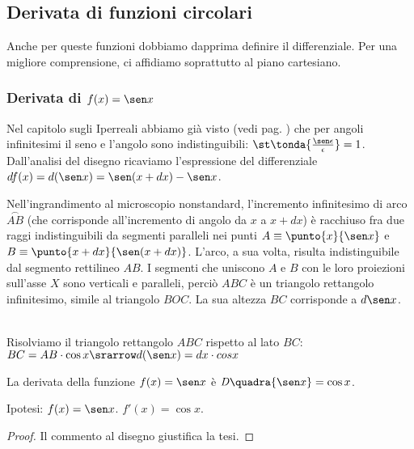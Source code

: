 \subsection{Derivata di funzioni circolari}
\label{}
Anche per queste funzioni dobbiamo dapprima definire il differenziale. 
Per una migliore comprensione, ci affidiamo soprattutto al piano cartesiano.
\subsubsection{Derivata di $f(x)=\sen x$}
Nel capitolo sugli Iperreali abbiamo già visto 
(vedi pag. \pageref{subsubsec:insnum_fseno}) che per angoli infinitesimi il 
seno e 
l'angolo sono indistinguibili: $\st\tonda{\frac{\sen 
\epsilon}{\epsilon}}=1$.
Dall'analisi del disegno ricaviamo l'espressione del differenziale
$df(x)=d(\sen x)= \sen (x+dx) -\sen x$.

\begin{inaccessibleblock}
  \begin{minipage}[]{.40\textwidth}
   \dseno 
 \end{minipage} 
  \hfill
 \begin{minipage}[]{.56\textwidth}
Nell'ingrandimento al microscopio nonstandard, l'incremento infinitesimo di
arco $\overset{\frown}{AB}$ (che corrisponde all'incremento di angolo da $x$
a $x+dx$) è racchiuso fra due raggi indistinguibili da segmenti paralleli 
nei
punti $A\equiv \punto{x}{\sen x}$ e $B\equiv \punto{x+dx}{\sen(x+dx)}$. 
L'arco, a sua volta, risulta indistinguibile dal segmento rettilineo $AB$.
I segmenti che uniscono $A$ e $B$ con le loro proiezioni sull'asse $X$ sono
verticali e paralleli, perciò $ABC$ è un triangolo rettangolo infinitesimo, 
simile al triangolo $BOC$. La sua altezza $BC$ corrisponde a $d\sen x$. 
 \end{minipage}
\end{inaccessibleblock}
\label{fig_diff01dseno}\\

Risolviamo il triangolo rettangolo $ABC$ rispetto al lato $BC$:\\
$BC=AB\cdot \cos x \srarrow d(\sen x)= dx\cdot cos x$  

\begin{teorema}
  La derivata della funzione $f(x)=\sen x$ è $\mathit{D}\quadra{\sen 
x}=\cos x$.
\end{teorema}
\noindent Ipotesi: $f(x)=\sen x$. \tab $f'(x)=\cos x$.
\begin{proof}
 Il commento al disegno giustifica la tesi. 
\end{proof}


